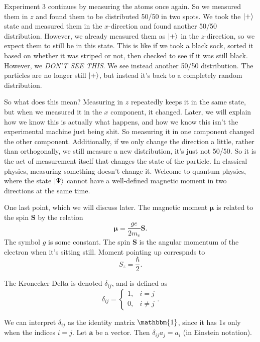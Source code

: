 Experiment 3 continues by measuring the atoms once again. So we measured them in $z $ and found them to be distributed 50/50 in two spots. We took the $\lvert+\rangle$ state and measured them in the $x$-direction and found another 50/50 distribution. However, we already measured them as $\lvert+\rangle$ in the $z$-direction, so we expect them to still be in this state. This is like if we took a black sock, sorted it based on whether it was striped or not, then checked to see if it was still black. However, we \emph{DON'T SEE THIS}. We see instead another 50/50 distribution. The particles are no longer still $\lvert+\rangle$, but instead it's back to a completely random distribution.

So what does this mean? Measuring in $z $ repeatedly keeps it in the same state, but when we measured it in the $x$ component, it changed. Later, we will explain how we know this is actually what happens, and how we know this isn't the experimental machine just being shit. So measuring it in one component changed the other component. Additionally, if we only change the direction a little, rather than orthogonally, we still measure a new distribution, it's just not 50/50. So it is the act of measurement itself that changes the state of the particle. In classical physics, measuring something doesn't change it. Welcome to quantum physics, where the state $\lvert\Psi \rangle$ cannot have a well-defined magnetic moment in two directions at the same time.

One last point, which we will discuss later. The magnetic moment $\boldsymbol{\mu} $ is related to the spin $\mathbf{S}$ by the relation
\[
	\boldsymbol{\mu} =\frac{ge}{2m_e}\mathbf{S}
.\]
The symbol $g$ is some constant. The spin $\mathbf{S}$ is the angular momentum of the electron when it's sitting still. Moment pointing up correspnds to
\[
	S_z = \frac{\hbar}{2}
.\]

\begin{definition}\label{dfn:1.1}
	The Kronecker Delta is denoted $\delta_{ij}$, and is defined as
	\[
		\delta_{ij}=
		\begin{cases}
			1,& i=j\\
			0,& i\neq j
		\end{cases}
	.\]
\end{definition}
We can interpret $\delta_{ij}$ as the identity matrix $\mathbbm{1} $, since it has 1s only when the indices $i=j$. Let $\mathbf{a}$ be a vector. Then $\delta_{ij}a_j=a_i$ (in Einstein notation). 
